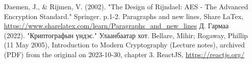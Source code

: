 
\singlespace
{}
\begin{thebibliography}{}
	Daemen, J., \& Rijmen, V. (2002). "The Design of Rijndael: AES - The Advanced Encryption Standard." Springer. p.1-2.
	Paragraphs and new lines,  Share LaTex, \url{https://www.sharelatex.com/learn/Paragraphs_and_new_lines}
	Д. Гармаа (2022). "Криптографын үндэс." Улаанбаатар хот.
	Bellare, Mihir; Rogaway, Phillip (11 May 2005), Introduction to Modern Cryptography (Lecture notes), archived (PDF) from the original on 2023-10-30, chapter 3.
	ReactJS, \url{https://reactjs.org/}
	

\end{thebibliography}